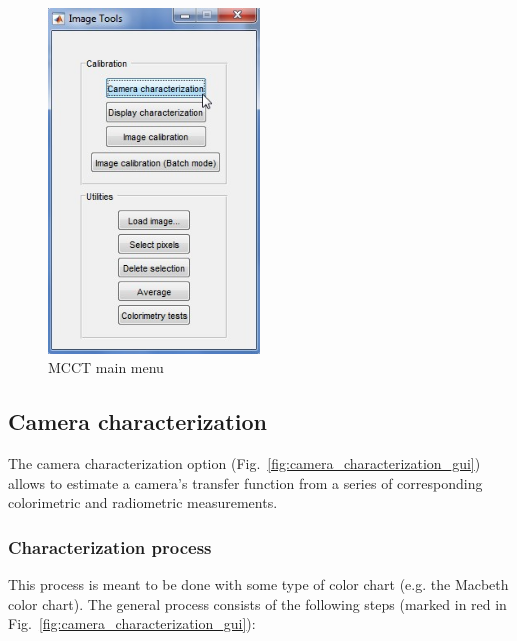 \documentclass[a4paper,12pt,oneside]{article}
\begin{document}
\begin{figure}[h]
    \centering
    \includegraphics[width=0.5\textwidth]{images/main_gui.jpg}
    \caption{MCCT main menu}
    \label{fig:main_menu}
\end{figure}

\subsection{Camera characterization}

The camera characterization option (Fig.~\ref{fig:camera_characterization_gui}) allows to estimate a camera's transfer function from a series of corresponding colorimetric and radiometric measurements. 

\subsubsection{Characterization process}

This process is meant to be done with some type of color chart (e.g. the Macbeth color chart). The general process consists of the following steps (marked in red in Fig.~\ref{fig:camera_characterization_gui}):
\end{document}
